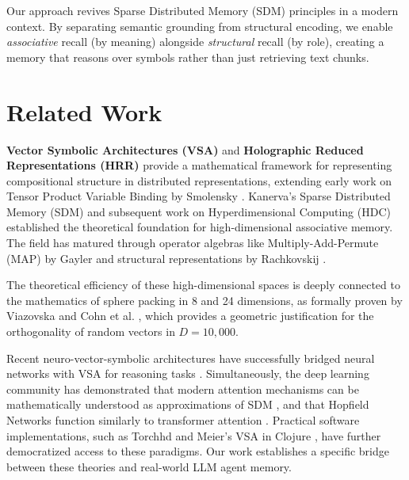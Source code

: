 \documentclass[11pt,letterpaper]{article}
\begin{document}
Our approach revives Sparse Distributed Memory (SDM) principles \cite{kanerva1988sdm} in a modern context. By separating semantic grounding from structural encoding, we enable \textit{associative} recall (by meaning) alongside \textit{structural} recall (by role), creating a memory that reasons over symbols rather than just retrieving text chunks.

\section{Related Work}
\label{sec:related}

\textbf{Vector Symbolic Architectures (VSA)} and \textbf{Holographic Reduced Representations (HRR)} \cite{plate1995holographic} provide a mathematical framework for representing compositional structure in distributed representations, extending early work on Tensor Product Variable Binding by Smolensky \cite{smolensky1990tensor}. Kanerva's Sparse Distributed Memory (SDM) \cite{kanerva1988sdm} and subsequent work on Hyperdimensional Computing (HDC) \cite{kanerva2009hyperdimensional} established the theoretical foundation for high-dimensional associative memory. The field has matured through operator algebras like Multiply-Add-Permute (MAP) by Gayler \cite{gayler2004vsa} and structural representations by Rachkovskij \cite{rachkovskij2001representation}.

The theoretical efficiency of these high-dimensional spaces is deeply connected to the mathematics of sphere packing in 8 and 24 dimensions, as formally proven by Viazovska \cite{viazovska2017sphere} and Cohn et al. \cite{cohn2017sphere}, which provides a geometric justification for the orthogonality of random vectors in $D=10{,}000$.

Recent neuro-vector-symbolic architectures have successfully bridged neural networks with VSA for reasoning tasks \cite{hersche2023neuro, kleyko2022vector}. Simultaneously, the deep learning community has demonstrated that modern attention mechanisms \cite{vaswani2017attention} can be mathematically understood as approximations of SDM \cite{bricken2021attention}, and that Hopfield Networks function similarly to transformer attention \cite{ramsauer2020hopfield}. Practical software implementations, such as Torchhd \cite{heddes2022torchhd} and Meier's VSA in Clojure \cite{meier2022vsa}, have further democratized access to these paradigms. Our work establishes a specific bridge between these theories and real-world LLM agent memory.

\clearpage
\end{document}
